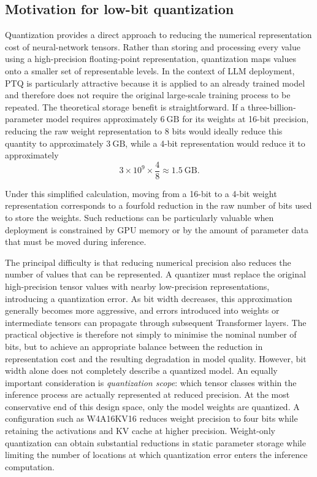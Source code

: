 \subsection{Motivation for low-bit quantization}
Quantization provides a direct approach to reducing the numerical representation cost of neural-network tensors. Rather than storing and processing every value using a high-precision floating-point representation, quantization maps values onto a smaller set of representable levels\cite{zhu-etal-2024-survey-model}. In the context of LLM deployment, \ac{PTQ} is particularly attractive because it is applied to an already trained model and therefore does not require the original large-scale training process to be repeated. The theoretical storage benefit is straightforward. If a three-billion-parameter model requires approximately \(6~\mathrm{GB}\) for its weights at 16-bit precision, reducing the raw weight representation to 8 bits would ideally reduce this quantity to approximately \(3~\mathrm{GB}\), while a 4-bit representation would reduce it to approximately \[ 3\times10^{9}\times\frac{4}{8} \approx 1.5~\mathrm{GB}. \] 

Under this simplified calculation, moving from a 16-bit to a 4-bit weight representation corresponds to a fourfold reduction in the raw number of bits used to store the weights. Such reductions can be particularly valuable when deployment is constrained by GPU memory or by the amount of parameter data that must be moved during inference. 

The principal difficulty is that reducing numerical precision also reduces the number of values that can be represented. A quantizer must replace the original high-precision tensor values with nearby low-precision representations, introducing a quantization error. As bit width decreases, this approximation generally becomes more aggressive, and errors introduced into weights or intermediate tensors can propagate through subsequent Transformer layers. The practical objective is therefore not simply to minimise the nominal number of bits, but to achieve an appropriate balance between the reduction in representation cost and the resulting degradation in model quality. However, bit width alone does not completely describe a quantized model. An equally important consideration is \emph{quantization scope}: which tensor classes within the inference process are actually represented at reduced precision. At the most conservative end of this design space, only the model weights are quantized. A configuration such as W4A16KV16 reduces weight precision to four bits while retaining the activations and {KV} cache at higher precision. Weight-only quantization can obtain substantial reductions in static parameter storage while limiting the number of locations at which quantization error enters the inference computation. 


